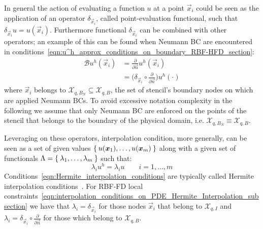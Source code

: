 In general the action of evaluating a function $u$ at a point $\vec{x}_i$ could be seen as the application of an operator $\delta_{\vec{x}_i}$, called point-evaluation functional, such that $\delta_{\vec{x}_i} u = u(\vec{x}_i)$. Furthermore functional $\delta_{\vec{x}_i}$ can be combined with other operators; an example of this can be found when Neumann BC are encountered in conditions~\eqref{eqn:u^h_approx_conditions_on_boundary_RBF-HFD_section}:
\begin{equation}
	\begin{aligned}
		\mathcal{B} u^h(\vec{x}_i) & = \frac{\partial}{\partial \vec{n}} u^h(\vec{x}_i)											\\
								   & = \bigg( \delta_{\vec{x}_i} \circ \frac{\partial}{\partial \vec{n}} \bigg) u^h(\cdot)
	\end{aligned}
\end{equation}
where $\vec{x}_i$ belongs to $\mathcal{X}_{q,B_N} \subseteq \mathcal{X}_{q,B}$, the set of stencil's boundary nodes on which are applied Neumann BCs. To avoid excessive notation complexity in the following we assume that only Neumann BC are enforced on the points of the stencil that belongs to the boundary of the physical domain, i.e. $\mathcal{X}_{q,B_N} \equiv \mathcal{X}_{q,B}$.

Leveraging on these operators, interpolation condition, more generally, can be seen as a set of given values $\Set{u(\boldsymbol{x}_1), \dots, u(\boldsymbol{x}_{m})}$ along with a given set of functionals $\Lambda = \Set{\lambda_1, \dots, \lambda_{m}}$ such that:
\begin{equation}
	\label{eqn:Hermite_interpolation_conditions}
	\lambda_i u^h = \lambda_i u \qquad i = 1, \dots, m
\end{equation}
Conditions~\eqref{eqn:Hermite_interpolation_conditions} are typically called Hermite interpolation conditions~\cite{Fasshauer:details_on_basic_functions}.
For RBF-FD local constraints~\eqref{eqn:interpolation_conditions_on_PDE_Hermite_Interpolation_subsection} we have that $\lambda_i = \delta_{\vec{x}_i}$ for those nodes $\vec{x}_i$ that belong to $\mathcal{X}_{q,I}$ and $\lambda_i = \delta_{\vec{x}_i} \circ \frac{\partial}{\partial \vec{n}}$ for those which belong to $\mathcal{X}_{q,B}$.

